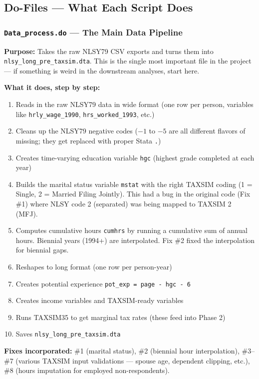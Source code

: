 \documentclass[11pt, letterpaper]{article}
\newcommand{\codebox}[1]{\texttt{\small #1}}
\newcommand{\dofile}[1]{\texttt{#1}}
\newcommand{\datafile}[1]{\texttt{#1}}
\begin{document}
\subsection{Do-Files --- What Each Script Does}

\subsubsection{\dofile{Data\_process.do} \textnormal{--- The Main Data Pipeline}}

\textbf{Purpose:} Takes the raw NLSY79 CSV exports and turns them into \datafile{nlsy\_long\_pre\_taxsim.dta}. This is the single most important file in the project --- if something is weird in the downstream analyses, start here.

\textbf{What it does, step by step:}
\begin{enumerate}
    \item Reads in the raw NLSY79 data in wide format (one row per person, variables like \codebox{hrly\_wage\_1990}, \codebox{hrs\_worked\_1993}, etc.)
    \item Cleans up the NLSY79 negative codes ($-1$ to $-5$ are all different flavors of missing; they get replaced with proper Stata \codebox{.})
    \item Creates time-varying education variable \codebox{hgc} (highest grade completed at each year)
    \item Builds the marital status variable \codebox{mstat} with the right TAXSIM coding (1 = Single, 2 = Married Filing Jointly). This had a bug in the original code (Fix \#1) where NLSY code 2 (separated) was being mapped to TAXSIM 2 (MFJ).
    \item Computes cumulative hours \codebox{cumhrs} by running a cumulative sum of annual hours. Biennial years (1994+) are interpolated. Fix \#2 fixed the interpolation for biennial gaps.
    \item Reshapes to long format (one row per person-year)
    \item Creates potential experience \codebox{pot\_exp = page - hgc - 6}
    \item Creates income variables and TAXSIM-ready variables
    \item Runs TAXSIM35 to get marginal tax rates (these feed into Phase 2)
    \item Saves \datafile{nlsy\_long\_pre\_taxsim.dta}
\end{enumerate}

\textbf{Fixes incorporated:} \#1 (marital status), \#2 (biennial hour interpolation), \#3--\#7 (various TAXSIM input validations --- spouse age, dependent clipping, etc.), \#8 (hours imputation for employed non-respondents).
\end{document}

